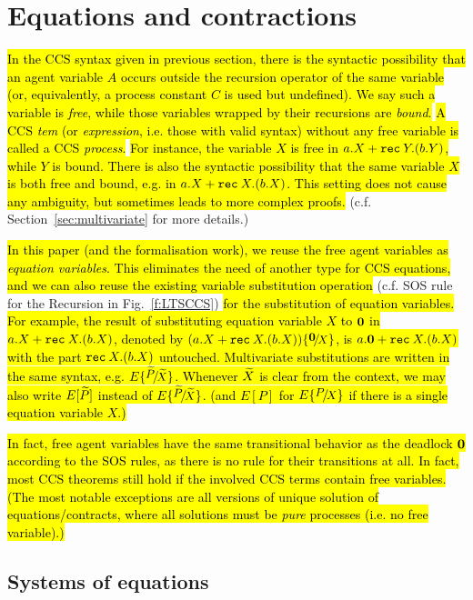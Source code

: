 \section{Equations and contractions}
\label{s:eq}

\hl{In the CCS syntax given in previous section, there is the syntactic
possibility that an agent variable $A$ occurs
outside the recursion operator of the same variable (or, equivalently, a
process constant $C$ is used but undefined). We say such a variable is
\emph{free}, while those variables wrapped by their recursions are
\emph{bound}.}
\hl{A CCS \emph{tem} (or \emph{expression}, i.e. those with valid syntax)
without any free variable is called a CCS \emph{process}.}
\hl{For instance, the variable $X$ is free in $a.X + {\tt rec}\: Y . (b.Y)$, while $Y$
is bound. There is also the syntactic possibility that the same
variable $X$ is
both free and bound, e.g. in $a.X + {\tt rec}\: X . (b.X)$.
This setting does not cause any ambiguity, but sometimes leads to more
complex proofs.} (c.f. Section~\ref{sec:multivariate} for more details.)

\hl{In this paper (and the formalisation work), we reuse the free agent
variables as \emph{equation variables}. This eliminates the need of
another type for CCS equations, and we can also reuse the existing
variable substitution operation} (c.f. SOS rule for the Recursion in
Fig.~\ref{f:LTSCCS}) \hl{for the substitution of equation variables.
For example, the result of substituting equation variable $X$ to ${\boldsymbol 0}$ in $a.X +
{\tt rec}\: X . (b.X)$, denoted by $(a.X + \recu X (b.X)) \sub {\nil} X$, is
$a.{\boldsymbol 0} + {\tt rec}\: X . (b.X)$ with the part ${\tt rec}\: X . (b.X)$
untouched. Multivariate substitutions are written in the same syntax,
e.g. $E \sub {\til P} {\til X}$. Whenever $\widetilde X$ is clear from the
context, we may also write $E[\widetilde P]$ instead of $E \sub {\til P} {\til
  X}$. (and $E[P]$ for $E \sub P X$ if there is a single equation variable $X$.)}

\hl{In fact, free agent variables have the same transitional behavior
as the deadlock ${\boldsymbol 0}$ according to the SOS rules, as there is
no rule for their transitions at all. In fact, most CCS theorems still hold if
the involved CCS terms contain free variables. (The most notable
exceptions are all versions of unique solution of equations/contracts,
where all solutions must be \emph{pure} processes (i.e. no free variable).)}

\subsection{Systems of equations}
\label{ss:SysEq}

